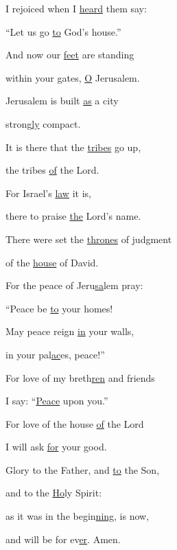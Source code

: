 \noindent I rejoiced when I \uline{heard} them say: ~\GreStar{}~\nopagebreak

“Let us go \uline{to} God’s house.”

\noindent And now our \uline{feet} are standing ~\GreStar{}~\nopagebreak

within your gates, \uline{O} Jerusalem.

\noindent Jerusalem is built \uline{as} a city ~\GreStar{}~\nopagebreak

strong\uline{ly} compact.

\noindent It is there that the \uline{tribes} go up, ~\GreStar{}~\nopagebreak

the tribes \uline{of} the Lord.

\noindent For Israel’s \uline{law} it is, ~\GreStar{}~\nopagebreak

there to praise \uline{the} Lord’s name.

\noindent There were set the \uline{thrones} of judgment ~\GreStar{}~\nopagebreak

of the \uline{house} of David.

\noindent For the peace of Jeru\uline{sa}lem pray: ~\GreStar{}~\nopagebreak

“Peace be \uline{to} your homes!

\noindent May peace reign \uline{in} your walls, ~\GreStar{}~\nopagebreak

in your pal\uline{ac}es, peace!”

\noindent For love of my breth\uline{ren} and friends ~\GreStar{}~\nopagebreak

I say: “\uline{Peace} upon you.”

\noindent For love of the house \uline{of} the Lord ~\GreStar{}~\nopagebreak

I will ask \uline{for} your good.

\noindent Glory to the Father, and \uline{to} the Son,~\GreStar{}~\nopagebreak

and to the \uline{Ho}ly Spirit:

\noindent as it was in the begin\uline{ning}, is now,~\GreStar{}~\nopagebreak

and will be for ev\uline{er}. Amen.
